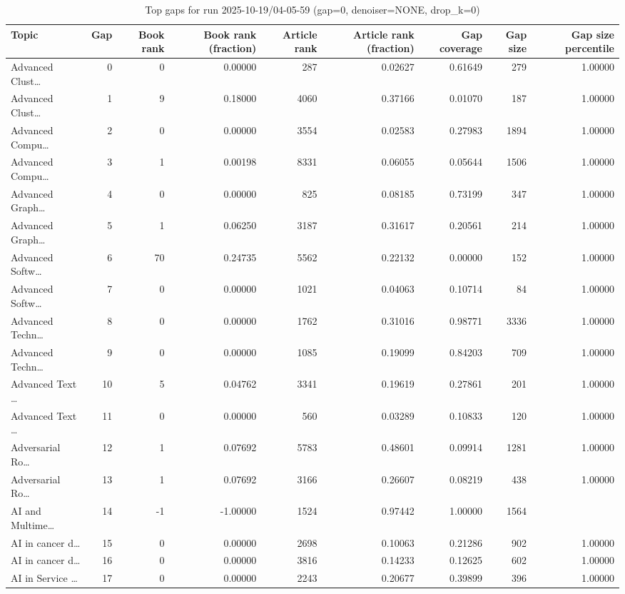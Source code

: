 \begin{table}
\caption{Top gaps for run 2025-10-19/04-05-59 (gap=0, denoiser=NONE, drop\_k=0)}
\label{tab:best_run_gap0_2025_10_19_04_05_59}
\begin{tabular}{lrrrrrrrr}
\toprule
Topic & Gap & Book rank & Book rank (fraction) & Article rank & Article rank (fraction) & Gap coverage & Gap size & Gap size percentile \\
\midrule
Advanced Clust… & 0 & 0 & 0.00000 & 287 & 0.02627 & 0.61649 & 279 & 1.00000 \\
Advanced Clust… & 1 & 9 & 0.18000 & 4060 & 0.37166 & 0.01070 & 187 & 1.00000 \\
Advanced Compu… & 2 & 0 & 0.00000 & 3554 & 0.02583 & 0.27983 & 1894 & 1.00000 \\
Advanced Compu… & 3 & 1 & 0.00198 & 8331 & 0.06055 & 0.05644 & 1506 & 1.00000 \\
Advanced Graph… & 4 & 0 & 0.00000 & 825 & 0.08185 & 0.73199 & 347 & 1.00000 \\
Advanced Graph… & 5 & 1 & 0.06250 & 3187 & 0.31617 & 0.20561 & 214 & 1.00000 \\
Advanced Softw… & 6 & 70 & 0.24735 & 5562 & 0.22132 & 0.00000 & 152 & 1.00000 \\
Advanced Softw… & 7 & 0 & 0.00000 & 1021 & 0.04063 & 0.10714 & 84 & 1.00000 \\
Advanced Techn… & 8 & 0 & 0.00000 & 1762 & 0.31016 & 0.98771 & 3336 & 1.00000 \\
Advanced Techn… & 9 & 0 & 0.00000 & 1085 & 0.19099 & 0.84203 & 709 & 1.00000 \\
Advanced Text … & 10 & 5 & 0.04762 & 3341 & 0.19619 & 0.27861 & 201 & 1.00000 \\
Advanced Text … & 11 & 0 & 0.00000 & 560 & 0.03289 & 0.10833 & 120 & 1.00000 \\
Adversarial Ro… & 12 & 1 & 0.07692 & 5783 & 0.48601 & 0.09914 & 1281 & 1.00000 \\
Adversarial Ro… & 13 & 1 & 0.07692 & 3166 & 0.26607 & 0.08219 & 438 & 1.00000 \\
AI and Multime… & 14 & -1 & -1.00000 & 1524 & 0.97442 & 1.00000 & 1564 &  \\
AI in cancer d… & 15 & 0 & 0.00000 & 2698 & 0.10063 & 0.21286 & 902 & 1.00000 \\
AI in cancer d… & 16 & 0 & 0.00000 & 3816 & 0.14233 & 0.12625 & 602 & 1.00000 \\
AI in Service … & 17 & 0 & 0.00000 & 2243 & 0.20677 & 0.39899 & 396 & 1.00000 \\

\end{tabular}
\end{table}
